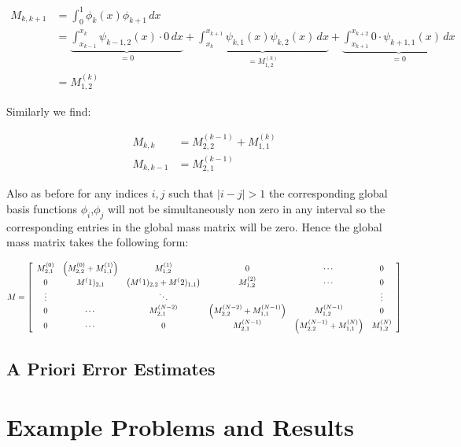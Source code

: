 \begin{align*}
	M_{k,k+1} &= \int_0^1\phi_k(x)\phi_{k+1}\, dx \\
              &= \underbrace{\int_{x_{k-1}}^{x_k}\psi_{k-1,2}(x) \cdot 0\, dx}_{ = 0}
               + \underbrace{\int_{x_k}^{x_{k+1}}\psi_{k,1}(x)\psi_{k,2}(x)\, dx}_{= M^{(k)}_{1,2}}
               + \underbrace{\int_{x_{k+1}}^{x_{k+2}}0 \cdot \psi_{k+1,1}(x)\, dx}_{= 0} \\
              &= M^{(k)}_{1,2}
\end{align*}

Similarly we find:

\begin{align*}
	M_{k,k} &= M^{(k-1)}_{2,2} + M^{(k)}_{1,1} \\
    M_{k,k-1} &= M^{(k-1)}_{2,1}
\end{align*}

Also as before for any indices $i,j$ such that $|i - j| > 1$ the corresponding global basis functions $\phi_i$,$\phi_j$
will not be simultaneously non zero in any interval so the corresponding entries in the global mass matrix will be zero. Hence
the global mass matrix takes the following form:

\begin{equation}\label{eq:oned-deterministic-global-mass}
	M = \left[\begin{array}{c c c c c c}
    		M^{(0)}_{2,1} & \left(M^{(0)}_{2,2} + M^{(1)}_{1,1}\right) & M^{(1)}_{1,2} & 0 & \cdots & 0 \\
            0 & M^(1)_{2,1} & \left(M^(1)_{2,2} + M^(2)_{1,1}\right) & M^{(2)}_{1,2} & \cdots & 0 \\
            \vdots & & \ddots & & & \vdots \\
            0 & \cdots & M^{(N-2)}_{2,1} & \left(M^{(N-2)}_{2,2} + M^{(N-1)}_{1,1}\right) & M^{(N-1)}_{1,2} & 0  \\
            0 &\cdots & 0 & M^{(N-1)}_{2,1} & \left(M^{(N-1)}_{2,2} + M^{(N)}_{1,1}\right) & M^{(N)}_{1,2}
        \end{array}\right]
\end{equation}

\subsection{A Priori Error Estimates}


\section{Example Problems and Results}

